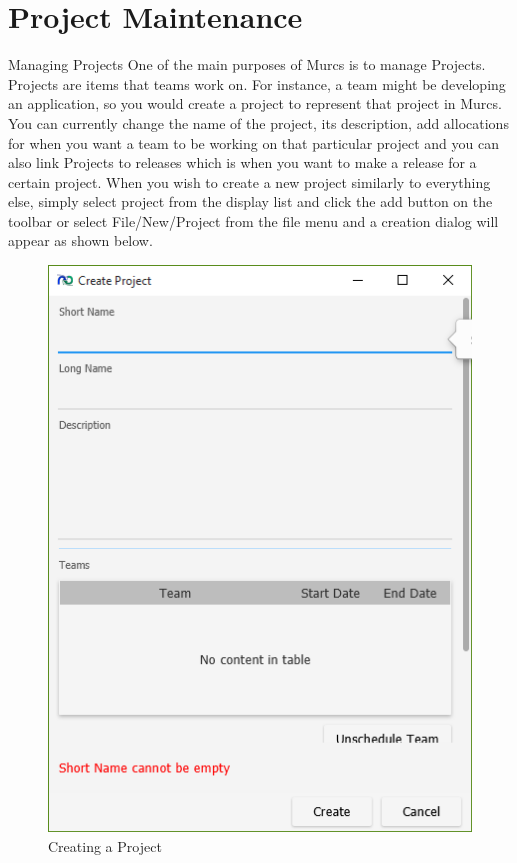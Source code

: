 \section{Project Maintenance}

Managing Projects
\newline\newline
One of the main purposes of Murcs is to manage Projects. Projects are items that teams work on. For instance, a team might be developing an application, so you would create a project to represent that project in Murcs. You can currently change the name of the project, its description, add allocations for when you want a team to be working on that particular project and you can also link Projects to releases which is when you want to make a release for a certain project.
\newline
When you wish to create a new project similarly to everything else, simply select project from the display list and click the add button on the toolbar or select File/New/Project from the file menu and a creation dialog will appear as shown below.

\begin{figure}[H]
\centering
\includegraphics[width=\textwidth]{images/screenshots/projects1.PNG}
\caption{Creating a Project}
\label{fig:new_project}
\end{figure}

